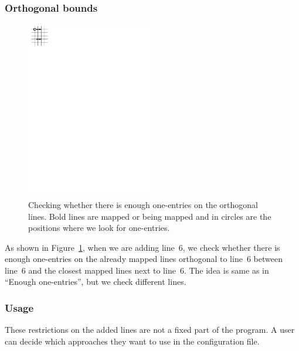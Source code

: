 \subsubsection{Orthogonal bounds}
\begin{figure}[h!]
\centering
\includegraphics[width=55mm]{../img/orthogonal.pdf}
\caption{Checking whether there is enough one-entries on the orthogonal lines. Bold lines are mapped or being mapped and in circles are the positions where we look for one-entries.}
\label{orthogonal}
\end{figure}
As shown in Figure~\ref{orthogonal}, when we are adding line~$6$, we check whether there is enough one-entries on the already mapped lines orthogonal to line~$6$ between line~$6$ and the closest mapped lines next to line~$6$. The idea is same as in ``Enough one-entries'', but we check different lines.

\subsubsection{Usage}
These restrictions on the added lines are not a fixed part of the program. A user can decide which approaches they want to use in the configuration file.

